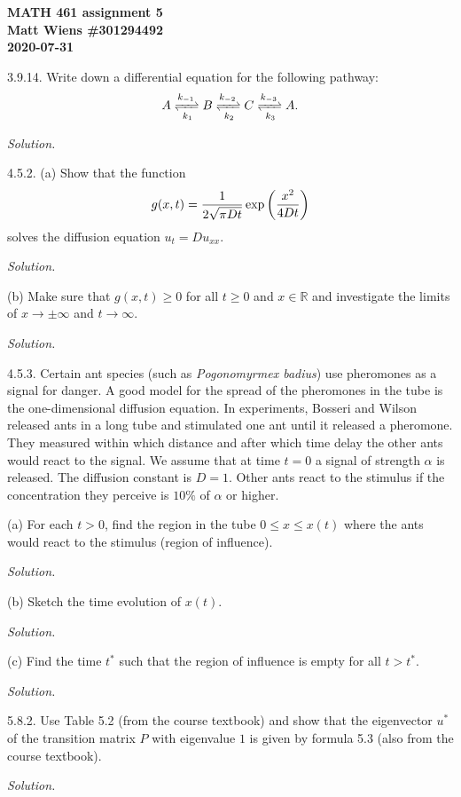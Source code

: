 \documentclass{article}
\newcommand{\R}{\mathbb{R}}
\begin{document}
\textbf{MATH 461 assignment 5} \\
\textbf{Matt Wiens \#301294492} \\
\textbf{2020-07-31}

3.9.14. Write down a differential equation for the following pathway:
%
\begin{equation*}
    A \xrightleftharpoons[k_1]{k_{-1}}
    B \xrightleftharpoons[k_2]{k_{-2}}
    C \xrightleftharpoons[k_3]{k_{-3}}
    A
    .
\end{equation*}

\textit{Solution.}

\newpage

4.5.2. (a) Show that the function
%
\begin{equation*}
    g(x, t) = \frac{1}{2 \sqrt{\pi D t}} \exp \del[3]{\frac{x^2}{4 D t}}
\end{equation*}
%
solves the diffusion equation $u_t = D u_{x x}$.

\textit{Solution.}

\vspace{5mm}

(b) Make sure that $g(x, t) \geq 0$ for all $t \geq 0$ and $x \in \R$ and
investigate the limits of $x \to \pm \infty$ and $t \to \infty$.

\textit{Solution.}

\newpage

4.5.3. Certain ant species (such as \textit{Pogonomyrmex badius}) use
pheromones as a signal for danger. A good model for the spread of the
pheromones in the tube is the one-dimensional diffusion equation. In
experiments, Bosseri and Wilson released ants in a long tube and stimulated
one ant until it released a pheromone. They measured within which distance
and after which time delay the other ants would react to the signal.
We assume that at time $t = 0$ a signal of strength $\alpha$ is released.
The diffusion constant is $D = 1$. Other ants react to the stimulus if the
concentration they perceive is $10\%$ of $\alpha$ or higher.

(a) For each $t > 0$, find the region in the tube $0 \leq x \leq x(t)$ where
the ants would react to the stimulus (region of influence).

\textit{Solution.}

\vspace{5mm}

(b) Sketch the time evolution of $x(t)$.

\textit{Solution.}

\vspace{5mm}

(c) Find the time $t^*$ such that the region of influence is empty for all
$t > t^*$.

\textit{Solution.}

\newpage

5.8.2. Use Table 5.2 (from the course textbook) and show that the eigenvector
$u^*$ of the transition matrix $P$ with eigenvalue $1$ is given by formula 5.3
(also from the course textbook).

\textit{Solution.}
\end{document}
